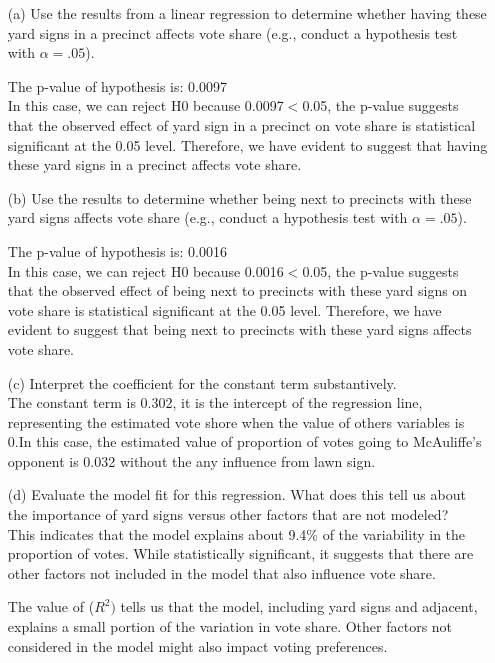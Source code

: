 \documentclass[12pt,letterpaper]{article}
\begin{document}
\vspace{.5cm}
\begin{enumerate}
	\item [(a)] Use the results from a linear regression to determine whether having these yard signs in a precinct affects vote share (e.g., conduct a hypothesis test with $\alpha = .05$).
	
	 The p-value of hypothesis is: 0.0097\\
	 In this case, we can reject H0 because 0.0097$<$0.05, the p-value suggests that the observed effect of yard sign in a precinct on vote share is statistical significant at the 0.05 level. Therefore, we have evident to suggest that having these yard signs in a precinct affects vote share.
	 
	 
	
		
	\item [(b)]  Use the results to determine whether being
	next to precincts with these yard signs affects vote
	share (e.g., conduct a hypothesis test with $\alpha = .05$).
	
	The p-value of hypothesis is: 0.0016\\
	In this case, we can reject H0 because 0.0016$<$0.05, the p-value suggests that the observed effect of being next to precincts with these yard signs on vote share is statistical significant at the 0.05 level. Therefore, we have evident to suggest that  being next to precincts with these yard signs affects vote share.
	\vspace{0.25cm}
	\item [(c)] Interpret the coefficient for the constant term substantively.\\
	The constant term is 0.302, it is the intercept of the regression line, representing the estimated vote shore when the value of others variables is 0.In this case, the estimated value of proportion of votes going to McAuliffe's opponent is 0.032 without the any influence from lawn sign.
	\vspace{0.25cm}
	
	
	\item [(d)] Evaluate the model fit for this regression.  What does this	tell us about the importance of yard signs versus other factors that are not modeled?\\
	This indicates that the model explains about 9.4\% of the variability in the proportion of votes. While statistically significant, it suggests that there are other factors not included in the model that also influence vote share.
	
    The value of (\(R^2)\) tells us that the model, including yard signs and adjacent, explains a small portion of the variation in vote share. Other factors not considered in the model might also impact voting preferences.
	
\end{enumerate}  
\end{document}

